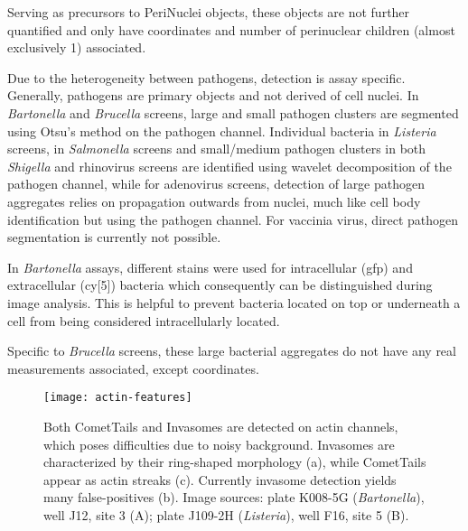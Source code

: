 \begin{description}[leftmargin=0.5cm]
\item[ExpandedNuclei:] Serving as precursors to PeriNuclei objects, these objects are not further quantified and only have coordinates and number of perinuclear children (almost exclusively 1) associated.
\item[Bacteria/Viruses/Pathogen:] Due to the heterogeneity between pathogens, detection is assay specific. Generally, pathogens are primary objects and not derived of cell nuclei. In \textit{Bartonella} and \textit{Brucella} screens, large and small pathogen clusters are segmented using Otsu's method on the pathogen channel. Individual bacteria in \textit{Listeria} screens,  in \textit{Salmonella} screens and small\slash medium pathogen clusters in both \textit{Shigella} and rhinovirus screens are identified using wavelet decomposition of the pathogen channel, while for adenovirus screens, detection of large pathogen aggregates relies on propagation outwards from nuclei, much like cell body identification but using the pathogen channel. For vaccinia virus, direct pathogen segmentation is currently not possible.
\item[IntBacteria/ExtBacteria:] In \textit{Bartonella} assays, different stains were used for intracellular (\acrshort{gfp}) and extracellular (\acrshort{cy}[5]) bacteria which consequently can be distinguished during image analysis. This is helpful to prevent bacteria located on top or underneath a cell from being considered intracellularly located.
\item[BlobBacteria:] Specific to \textit{Brucella} screens, these large bacterial aggregates do not have any real measurements associated, except coordinates.

\begin{figure}
  \centering
  \texttt{[image: actin-features]}
  \caption[Detection of two actin based structures, CometTails and Invasomes.]{Both CometTails and Invasomes are detected on actin channels, which poses difficulties due to noisy background. Invasomes are characterized by their ring-shaped morphology (a), while CometTails appear as actin streaks (c). Currently invasome detection yields many false-positives (b). Image sources: plate K008-5G (\textit{Bartonella}), well J12, site 3 (A); plate J109-2H (\textit{Listeria}), well F16, site 5 (B).}
  \label{fig:actin-features}
\end{figure}


\end{description}
